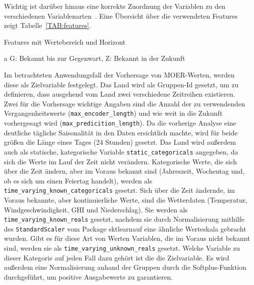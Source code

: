 Wichtig ist darüber hinaus eine korrekte Zuordnung der Variablen zu den verschiedenen Variablenarten~\cite{GitHub.20240307T20:56:16.000Z}.
Eine Übersicht über die verwendeten Features zeigt Tabelle~\ref{TAB:features}.
\begin{table}[ht]
 \centering
 \begin{threeparttable}
  \caption{Features mit Wertebereich und Horizont}
  \label{TAB:features}
  

  \begin{tablenotes}
   \item[a] G: Bekannt bis zur Gegenwart, Z: Bekannt in der Zukunft
  \end{tablenotes}

 \end{threeparttable}
\end{table}
Im betrachteten Anwendungsfall der Vorhersage von \ac{MOER}-Werten, werden diese als Zielvariable festgelegt.
Das Land wird als Gruppen-Id gesetzt, um zu definieren, dass ausgehend vom Land zwei verschiedene Zeitreihen existieren.
Zwei für die Vorhersage wichtige Angaben sind die Anzahl der zu verwendenden Vergangenheitswerte (\lstinline[columns=fixed]{max_encoder_length}) und wie weit in die Zukunft vorhergesagt wird (\lstinline[columns=fixed]{max_predicition_length}).
Da die vorherige Analyse eine deutliche tägliche Saisonalität in den Daten ersichtlich machte, wird für beide größen die Länge eines Tages (24 Stunden) gesetzt.
Das Land wird außerdem auch als statische, kategorische Variable \lstinline[columns=fixed]{static_categoricals} angegeben, da sich die Werte im Lauf der Zeit nicht verändern.
Kategorische Werte, die sich über die Zeit ändern, aber im Voraus bekannt sind (Jahreszeit, Wochentag und, ob es sich um einen Feiertag handelt), werden als \lstinline[columns=fixed]{time_varying_known_categoricals} gesetzt.
Sich über die Zeit ändernde, im Voraus bekannte, aber kontinuierliche Werte, sind die Wetterdaten (Temperatur, Windgeschwindigkeit, \ac{GHI} und Niederschlag).
Sie werden als \lstinline[columns=fixed]{time_varying_known_reals} gesetzt, nachdem sie durch Normalisierung mithilfe des \lstinline[columns=fixed]{StandardScaler} vom Package \glqq sktlearn\grqq auf eine ähnliche Werteskala gebracht wurden.
Gibt es für diese Art von Werten Variablen, die im Voraus nicht bekannt sind, werden sie als \lstinline[columns=fixed]{time_varying_unknown_reals} gesetzt.
Welche Variable zu dieser Kategorie auf jeden Fall dazu gehört ist die die Zielvariable.
Es wird außerdem eine Normalisierung anhand der Gruppen durch die Softplus-Funktion durchgeführt, um positive Ausgabewerte zu garantieren.
